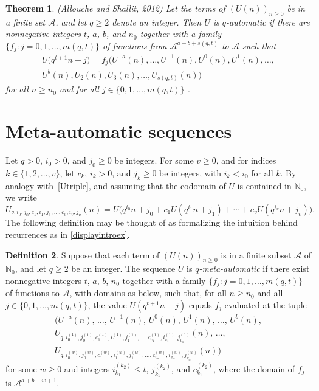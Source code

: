 \documentclass[12pt,reqno]{article}
\theoremstyle{plain}
\newtheorem{theorem}{Theorem}
\theoremstyle{definition}
\newtheorem{definition}[theorem]{Definition}
\theoremstyle{remark}
\begin{document}
\begin{theorem}\label{AScrit} 
 (Allouche and Shallit, 2012) Let the terms of $(U(n))_{n \geq 0}$ be in a finite set $\mathcal{A}$, and let $q\geq 2$ denote an integer. 
 Then $U$ is $q$-automatic if there are nonnegative integers $t$, $a$, $b$, and $n_0$ together with a family $\{ f_{j} : j = 0, 1, \ldots, 
 m(q, t) \}$ of functions from $\mathcal{A}^{a + b + s(q, t)}$ to $\mathcal{A}$ such that 
\begin{multline*}
 U\big( q^{t+1} n + j \big) = 
 f_{j}\big( U^{-a}(n), \ldots, U^{-1}(n), U^{0}(n), U^{1}(n), \ldots, \\ U^{b}(n), U_{2}(n), 
 U_{3}(n), \ldots, U_{s(q, t)}(n) \big)
\end{multline*}
 for all $n \geq n_0$ and for all $j \in \{ 0, 1, \ldots, m(q, t) \}$ \cite{AlloucheShallit2012}. 
\end{theorem}

\section{Meta-automatic sequences}\label{sectionmetamain} 
 Let $q>0$, $i_0>0$, and $j_0\ge 0$ be integers. For some $v\ge 0$, and for indices $k\in\{1,2,\ldots,v\}$, let $c_k$, $i_k>0$, and $j_k\ge 
 0$ be integers, with $i_k<i_0$ for all $k$. By analogy with~\eqref{Utriple}, and assuming that the codomain of $U$ is contained in 
 $\mathbb{N}_0$, we write $$ U_{q, i_0, j_0, c_1, i_1, j_1, \ldots, c_v, i_v, j_v}(n) = U\Big(q^{i_0} n + 
 j_0+c_1 U(q^{i_1}n+j_1)+\cdots+c_v U(q^{i_v}n+j_v)\Big). $$
 The following definition may be thought of as formalizing 
 the intuition behind recurrences as in \eqref{displayintroex}. 

\begin{definition}\label{metaauto} 
 Suppose that each term of $(U(n))_{n\ge 0}$ is in a finite subset $\mathcal{A}$ of $\mathbb{N}_0$, and let $q\ge 2$ be an 
 integer. The sequence $U$ is \emph{$q$-meta-automatic} if there exist nonnegative integers $t$, $a$, $b$, $n_0$ together with a family
 $\{f_j : j=0,1,\ldots,m(q,t)\}$ of functions to $\mathcal{A}$, with domains as below,
 such that, for all $n\ge n_0$ and all $j\in\{0,1,\ldots,m(q,t)\}$, the value
 $U(q^{t+1}n+j)$ equals $f_j$ evaluated at the tuple
\begin{multline*}
 \Big( U^{-a}(n),\,\ldots,\,U^{-1}(n),\,U^{0}(n),\,U^{1}(n),\,\ldots,\,U^{b}(n),\\
 U_{q,i_0^{(1)},j_0^{(1)},c_1^{(1)},i_1^{(1)},j_1^{(1)},\ldots,c_{v_1}^{(1)},i_{v_1}^{(1)},j_{v_1}^{(1)}}(n),\,\ldots,\\
 U_{q,i_0^{(w)},j_0^{(w)},c_1^{(w)},i_1^{(w)},j_1^{(w)},\ldots,c_{v_w}^{(w)},i_{v_w}^{(w)},j_{v_w}^{(w)}}(n)\Big)
\end{multline*}
 for some $w\ge 0$ and integers $i_{k_1}^{(k_2)}\le t$, $j_{k_1}^{(k_2)}$, and
 $c_{k_1}^{(k_2)}$, where the domain of $f_j$ is $\mathcal{A}^{a+b+w+1}$.
\end{definition}
\end{document}
